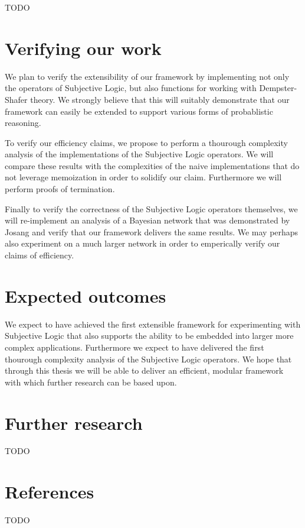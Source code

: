 \documentclass[a4paper]{article}
\begin{document}
\par
TODO

\section{Verifying our work}

\par
We plan to verify the extensibility of our framework by implementing not only the
operators of Subjective Logic, but also functions for working with Dempster-Shafer
theory. We strongly believe that this will suitably demonstrate that our framework can
easily be extended to support various forms of probablistic reasoning.

\par
To verify our efficiency claims, we propose to perform a thourough complexity analysis
of the implementations of the Subjective Logic operators. We will compare these results
with the complexities of the naive implementations that do not leverage memoization in
order to solidify our claim. Furthermore we will perform proofs of termination.

\par
Finally to verify the correctness of the Subjective Logic operators themselves, we
will re-implement an analysis of a Bayesian network that was demonstrated by Josang
and verify that our framework delivers the same results. We may perhaps also experiment
on a much larger network in order to emperically verify our claims of efficiency.

\section{Expected outcomes}

\par
We expect to have achieved the first extensible framework for experimenting with
Subjective Logic that also supports the ability to be embedded into larger more complex
applications. Furthermore we expect to have delivered the first thourough complexity
analysis of the Subjective Logic operators. We hope that through this thesis we will be
able to deliver an efficient, modular framework with which further research can be
based upon.


\section{Further research}

\par
TODO

\section{References}

\par
TODO
\end{document}
